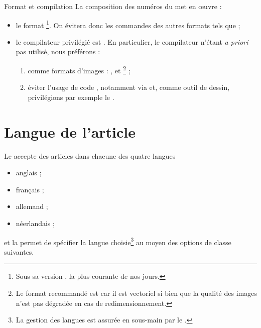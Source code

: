 \begin{dbwarning}{Format et compilation }{}
  La composition des numéros du \nwejm*{} met en œuvre :
  \begin{itemize}
  \item le format \footnote{Sous sa version , la
      plus courante de nos jours.}. On évitera donc les commandes des autres
    formats tels que  ;
  \item le compilateur privilégié est . En particulier, le
    compilateur  n'étant \emph{a priori} pas utilisé, nous
    préférons :
    \begin{enumerate}
    \item comme formats d'images : ,  et
      \footnote{Le format recommandé est  car il est
        vectoriel si bien que la qualité des images n'est pas dégradée en cas de
        redimensionnement.} ;
    \item éviter l'usage de code , notamment via
       et, comme outil de dessin, privilégions par exemple le
      .
    \end{enumerate}
  \end{itemize}
\end{dbwarning}

\section{Langue de l'article}
\label{sec:langue-de-larticle}

Le \nwejm{} accepte des articles dans chacune des quatre langues
\begin{itemize}
\item anglais ;
\item français ;
\item allemand ;
\item néerlandais ;
\end{itemize}
et la \nwejmauthorcl{} permet de spécifier la langue choisie\footnote{La gestion
  des langues est assurée en sous-main par le .} au moyen des
options de classe suivantes.

